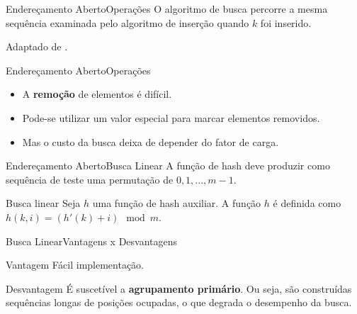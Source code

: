 \documentclass[aspectratio=169]{beamer}
\begin{document}
\begin{frame}{Endereçamento Aberto}{Operações}
O algoritmo de busca percorre a mesma sequência examinada pelo algoritmo de inserção quando $k$ foi inserido.

\tiny{Adaptado de .}
\end{frame}

\begin{frame}{Endereçamento Aberto}{Operações}
\begin{itemize}
\item A {\bf remoção} de elementos é difícil. 
\item Pode-se utilizar um valor especial para marcar elementos removidos.
\item Mas o custo da busca deixa de depender do fator de carga.
\end{itemize}
\end{frame}


\begin{frame}{Endereçamento Aberto}{Busca Linear}
A função de hash deve produzir como sequência de teste uma permutação de ${0, 1, . . . , m - 1}$.
\begin{block}{Busca linear}
Seja $h$ uma função de hash auxiliar. A função $h$ é definida como $h(k, i) = (h' (k) + i) \mod m$.
\end{block}
\end{frame}

\begin{frame}{Busca Linear}{Vantagens x Desvantagens}
\begin{block}{Vantagem}
Fácil implementação.
\end{block}
\begin{block}{Desvantagem}
É suscetível a {\bf agrupamento primário}. Ou seja, são construídas sequências longas de posições ocupadas, o que degrada o desempenho da busca.
\end{block} 
\end{frame}
\end{document}
